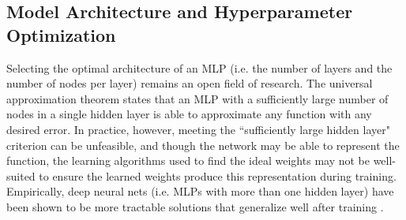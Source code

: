 

\subsection{Model Architecture and Hyperparameter Optimization}
\label{sec:hyperparam}
Selecting the optimal architecture of an MLP (i.e. the number of layers and the number of nodes per layer) remains an open field of research. The universal approximation theorem states that an MLP with a sufficiently large number of nodes in a single hidden layer is able to approximate any function with any desired error. In practice, however, meeting the ``sufficiently large hidden layer" criterion can be unfeasible, and though the network may be able to represent the function, the learning algorithms used to find the ideal weights may not be well-suited to ensure the learned weights produce this representation during training. Empirically, deep neural nets (i.e. MLPs with more than one hidden layer) have been shown to be more tractable solutions that generalize well after training \citep{goodfellow_deep_2016}.

